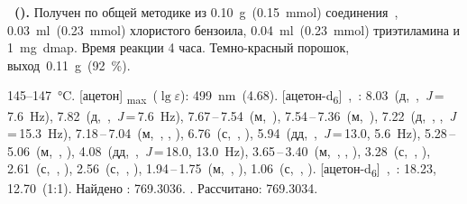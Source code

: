 \textbf{~().} 
Получен по общей методике из \SI{0.10}{\gram}~(\SI{0.15}{\milli\mole}) соединения~, \SI{0.03}{\milli\litre}~(\SI{0.23}{\milli\mole}) хлористого бензоила, \SI{0.04}{\milli\litre}~(\SI{0.23}{\milli\mole}) триэтиламина и \SI{1}{\milli\gram}~\ac{dmap}.
Время реакции 4 часа.
Темно-красный порошок, выход~\SI{0.11}{\gram}~(\SI{92}{\percent}).
\begin{experimental}
     145--\SI{147}{\celsius}.
    [ацетон] \chemlambda\textsubscript{max}~($\lg \varepsilon$): \SI{499}{\nano\metre}~(4.68).
    [ацетон-d\textsubscript{6}]~\chemdelta,~\si{\ppm}: 8.03~(д,~,~\textit{J}\,=\,7.6~\si{\hertz}), 7.82~(д,~,~\textit{J}\,=\,7.6~\si{\hertz}), 7.67\,--\,7.54~(м,~), 7.54\,--\,7.36~(м,~), 7.22~(д,~, ,~\textit{J}\,=\,15.3~\si{\hertz}), 7.18\,--\,7.04~(м,~, , ), 6.76~(с,~, ), 5.94~(дд,~,~\textit{J}\,=\,13.0, 5.6~\si{\hertz}), 5.28\,--\,5.06~(м,~, ), 4.08~(дд,~,~\textit{J}\,=\,18.0, 13.0~\si{\hertz}), 3.65\,--\,3.40~(м,~, , ), 3.28~(с,~, ), 2.61~(с,~, ), 2.56~(с,~, ), 1.94\,--\,1.75~(м,~, ), 1.06~(с,~, ).
    [ацетон-d\textsubscript{6}]~\chemdelta,~\si{\ppm}: 18.23, 12.70~(1:1).
     Найдено \ce{[M+]}: \num{769.3036}. . Рассчитано:  \num{769.3034}.
\end{experimental}

